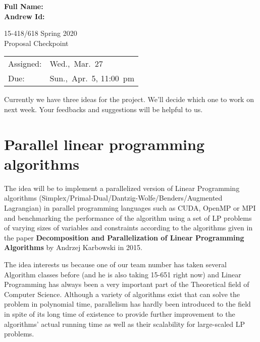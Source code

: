 \documentclass[11pt]{article}
\begin{document}
	\begin{flushright}
		{\large\bf Full Name: } \\[1ex]
		
		{\large\bf Andrew Id: } \\[1ex]
	\end{flushright}
	\vspace*{0.3in}
	\begin{center}
		\LARGE
		15-418/618 Spring 2020{} \\
		Proposal Checkpoint
		\\ 
	\end{center}
	
	\begin{center}
		\Large        
		\begin{tabular}{ll}
			\hline             
			Assigned: & Wed.,~Mar.~27  \\
			Due: &  Sun.,~Apr.~5, 11:00~pm  \\
			\hline       
		\end{tabular}
	\end{center} 

	Currently we have three ideas for the project. We'll decide which one to work on next week. Your feedbacks and suggestions will be helpful to us.
	
	\section{Parallel linear programming algorithms}
	The idea will be to implement a parallelized version of Linear Programming algorithms (Simplex/Primal-Dual/Dantzig-Wolfe/Benders/Augmented Lagrangian) in parallel programming languages such as CUDA, OpenMP or MPI and benchmarking the performance of the algorithm using a set of LP problems of varying sizes of variables and constraints according to the algorithms given in the paper \textbf{Decomposition and Parallelization of Linear Programming Algorithms} by Andrzej Karbowski in 2015.
	
	The idea interests us because one of our team number has taken several Algorithm classes before (and he is also taking 15-651 right now) and Linear Programming has always been a very important part of the Theoretical field of Computer Science. Although a variety of algorithms exist that can solve the problem in polynomial time, parallelism has hardly been introduced to the field in spite of its long time of existence to provide further improvement to the algorithms' actual running time as well as their scalability for large-scaled LP problems.
	
\end{document}
